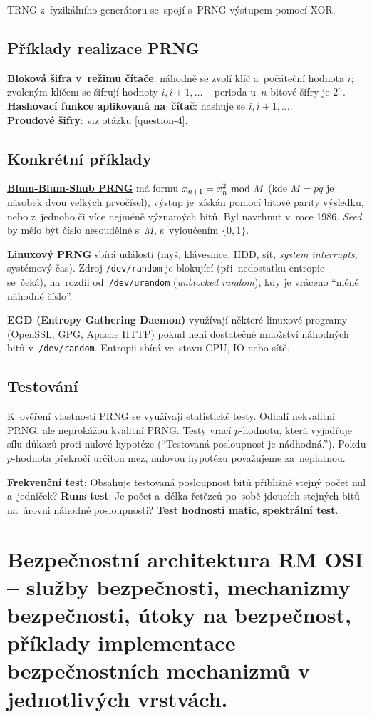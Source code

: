 TRNG z~fyzikálního generátoru se~spojí s~PRNG výstupem pomocí XOR.

\subsection{Příklady realizace PRNG}

\textbf{Bloková šifra v~režimu čítače}: náhodně se zvolí klíč a~počáteční hodnota $i$; zvoleným klíčem se šifrují hodnoty $i, i+1, \dots$ -- perioda u~$n$-bitové šifry je $2^n$. \\
\textbf{Hashovací funkce aplikovaná na~čítač}: hashuje se $i, i+1, \dots$. \\
\textbf{Proudové šifry}: viz otázku \ref{question-4}.

\subsection{Konkrétní příklady}

\textbf{\href{https://en.wikipedia.org/wiki/Blum_Blum_Shub}{Blum-Blum-Shub PRNG}} má formu $x_{n+1} = x_n^2 \ \mathrm{mod}\ M$ (kde $M = pq$ je násobek dvou velkých prvočísel), výstup je~získán pomocí bitové parity výsledku, nebo z~jednoho či více nejméně významých bitů. Byl navrhnut v~roce 1986. \emph{Seed} by mělo být číslo nesoudělné s~$M$, s~vyloučením $\{0, 1\}$.

\textbf{Linuxový PRNG} sbírá události (myš, klávesnice, HDD, síť, \emph{system interrupts}, systémový čas). Zdroj \texttt{/dev/random} je blokující (při~nedostatku entropie se~čeká), na~rozdíl od~\texttt{/dev/urandom} (\emph{unblocked random}), kdy je vráceno \enquote{méně náhodné číslo}.

\textbf{EGD (Entropy Gathering Daemon)} využívají některé linuxové programy (OpenSSL, GPG, Apache HTTP) pokud není dostatečné množství náhodných bitů v~\texttt{/dev/random}. Entropii sbírá ve~stavu CPU, IO nebo sítě.

\subsection{Testování}

K~ověření vlastností PRNG se využívají statistické testy. Odhalí nekvalitní PRNG, ale neprokážou kvalitní PRNG. Testy vrací $p$-hodnotu, která vyjadřuje sílu důkazů proti nulové hypotéze (\enquote{Testovaná posloupnost je nádhodná.}). Pokdu $p$-hodnota překročí určitou mez, nulovou hypotézu považujeme za~neplatnou.

\textbf{Frekvenční test}: Obsahuje testovaná posloupnost bitů přibližně stejný počet nul a~jedniček? \textbf{Runs test}: Je počet a~délka řetězců po~sobě jdoucích stejných bitů na~úrovni náhodné posloupnosti? \textbf{Test hodností matic}, \textbf{spektrální test}.

\clearpage
\section{Bezpečnostní architektura RM OSI -- služby bezpečnosti, mechanizmy bezpečnosti, útoky na bezpečnost, příklady implementace bezpečnostních mechanizmů v jednotlivých vrstvách.}
